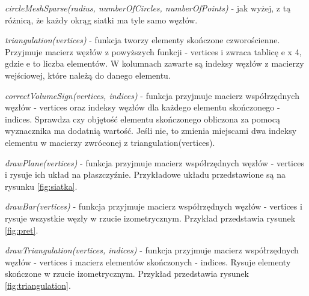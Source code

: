 \vspace {3mm}
\textit{circleMeshSparse(radius, numberOfCircles, numberOfPoints)} - jak wyżej, z tą różnicą, że każdy okrąg siatki ma tyle samo węzłów.

\vspace {3mm}
\textit{triangulation(vertices)} - funkcja tworzy elementy skończone czworościenne. Przyjmuje macierz węzłów z powyższych funkcji - vertices i zwraca tablicę e x 4, gdzie e to liczba elementów. W kolumnach zawarte są indeksy węzłów z macierzy wejściowej, które należą do danego elementu.

\vspace {3mm}
\textit{correctVolumeSign(vertices, indices)} - funkcja przyjmuje macierz współrzędnych węzłów - vertices oraz indeksy węzłów dla każdego elementu skończonego - indices. Sprawdza czy objętość elementu skończonego obliczona za pomocą wyznacznika ma dodatnią wartość. Jeśli nie, to zmienia miejscami dwa indeksy elementu w macierzy zwróconej z triangulation(vertices).

\vspace {3mm}
\textit{drawPlane(vertices)} - funkcja przyjmuje macierz współrzędnych węzłów - vertices i rysuje ich układ na płaszczyźnie. Przykładowe układu przedstawione są na rysunku \ref{fig:siatka}.

\vspace {3mm}
\textit{drawBar(vertices)} - funkcja przyjmuje macierz współrzędnych węzłów - vertices i rysuje wszystkie węzły w rzucie izometrycznym. Przykład przedstawia rysunek \ref{fig:pret}.

\vspace {3mm}
\textit{drawTriangulation(vertices, indices)} - funkcja przyjmuje macierz współrzędnych węzłów - vertices i macierz elementów skończonych - indices. Rysuje elementy skończone w rzucie izometrycznym. Przykład przedstawia rysunek \ref{fig:triangulation}.

